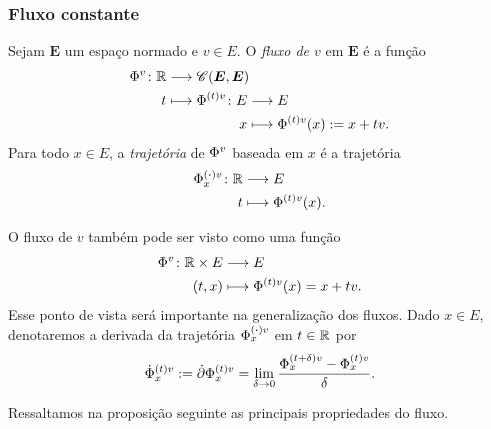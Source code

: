 \subsubsection{Fluxo constante}

\begin{definition}
Sejam $\bm E$ um espaço normado e $v \in E$. O \emph{fluxo de $v$} em $\bm E$ é a função
	\begin{align*}
	\func{\fluxo{}{v}}{\R}{\Cont(\bm E,\bm E)}{t}{
		\begin{aligned}[t]
		\func{\fluxo{(t)}{v}}{E}{E}{x}{\fluxo{(t)}{v}(x) := x+tv}.
		\end{aligned}
	}
	\end{align*}
Para todo $x \in E$, a \emph{trajetória} de $\fluxo{}{v}$ baseada em $x$ é a trajetória
	\begin{align*}
	\func{\fluxo{(\var)}{v}_{x}}{\R}{E}{t}{\fluxo{(t)}{v}(x)}.
	\end{align*}
\end{definition}

O fluxo de $v$ também pode ser visto como uma função
	\begin{align*}
	\func{\fluxo{}{v}}{\R \times E}{E}{(t,x)}{\fluxo{(t)}{v}(x) = x+tv}.
	\end{align*}
Esse ponto de vista será importante na generalização dos fluxos. Dado $x \in E$, denotaremos a derivada da trajetória $\fluxo{(\var)}{v}_{x}$ em $t \in \R$ por
	\begin{equation*}
	\fluxo[\dot]{(t)}{v}_{x} := \der \fluxo{(t)}{v}_{x} = \lim_{\delta \to 0} \frac{\fluxo{(t+\delta)}{v}_{x} - \fluxo{(t)}{v}_{x}}{\delta}.
	\end{equation*}

Ressaltamos na proposição seguinte as principais propriedades do fluxo.

